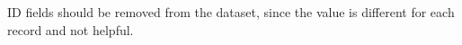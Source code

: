 ID fields should be removed from the dataset, since the value is different for each record and not helpful.




